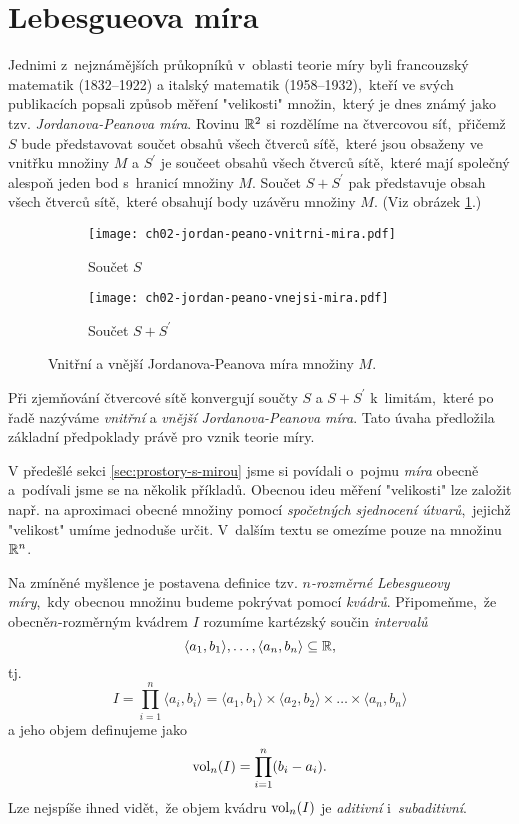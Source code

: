 \section{Lebesgueova míra}\label{sec:lebesgueova-mira}

Jednimi z~nejznámějších průkopníků v~oblasti teorie míry byli francouzský matematik  (1832--1922) a italský matematik  (1958--1932),~kteří ve svých publikacích popsali způsob měření "velikosti" množin,~který je dnes známý jako tzv. \emph{Jordanova-Peanova míra}. Rovinu $\mathbb{R}^2$ si rozdělíme na čtvercovou síť,~přičemž $S$ bude představovat součet obsahů všech čtverců síťě,~které jsou obsaženy ve vnitřku množiny $M$ a $S^\prime$ je součeet obsahů všech čtverců sítě,~které mají společný alespoň jeden bod s~hranicí množiny $M$. Součet $S+S^\prime$ pak představuje obsah všech čtverců sítě,~které obsahují body uzávěru množiny $M$. (Viz obrázek \ref{fig:jordan-peano-mira}.)
\begin{figure}[h]
    \centering
    \begin{subfigure}{0.4\textwidth}
        \centering
        \texttt{[image: ch02-jordan-peano-vnitrni-mira.pdf]}
        \caption{Součet $S$}
    \end{subfigure}
    \qquad
    \begin{subfigure}{0.4\textwidth}
        \centering
        \texttt{[image: ch02-jordan-peano-vnejsi-mira.pdf]}
        \caption{Součet $S+S^\prime$}
    \end{subfigure}
    \caption{Vnitřní a vnější Jordanova-Peanova míra množiny $M$.}
    \label{fig:jordan-peano-mira}
\end{figure}
Při zjemňování čtvercové sítě konvergují součty $S$ a $S+S^\prime$ k~limitám,~které po řadě nazýváme \emph{vnitřní} a \emph{vnější Jordanova-Peanova míra}. Tato úvaha předložila základní předpoklady právě pro vznik teorie míry. \cite{Sarmanova1996}

V předešlé sekci \ref{sec:prostory-s-mirou} jsme si povídali o~pojmu \emph{míra} obecně a~podívali jsme se na několik příkladů. Obecnou ideu měření "velikosti" lze založit např. na aproximaci obecné množiny pomocí \emph{spočetných sjednocení útvarů},~jejichž "velikost" umíme jednoduše určit. V~dalším textu se omezíme pouze na množinu $\mathbb{R}^n$.

Na zmíněné myšlence je postavena definice tzv. \emph{$n$-rozměrné Lebesgueovy míry},~kdy obecnou množinu budeme pokrývat pomocí \emph{kvádrů}. Připomeňme,~že obecně\linebreak\mbox{$n$-rozměrným} kvádrem $I$ rozumíme kartézský součin \emph{intervalů}
\[\langle a_1,b_1\rangle,\ldots,\langle a_n,b_n\rangle\subseteq\mathbb{R},\]
tj.
\[I=\prod_{i=1}^{n}\langle a_i,b_i\rangle=\langle a_1,b_1\rangle\times\langle a_2,b_2\rangle\times\dots\times\langle a_n,b_n\rangle\]
a jeho objem definujeme jako
\[\operatorname{vol}_n(I)=\prod_{i=1}^{n}(b_i-a_i).\]
Lze nejspíše ihned vidět,~že objem kvádru $\operatorname{vol}_n(I)$ je \emph{aditivní} i~\textit{subaditivní}.

